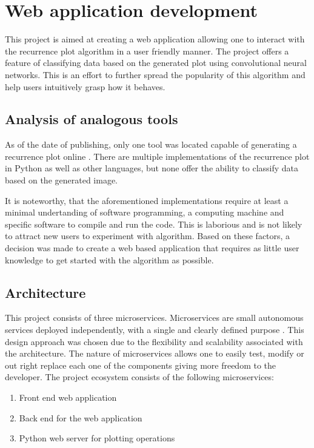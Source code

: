 \documentclass[a4paper,12pt,fleqn]{article}
\begin{document}
\newpage


\section{Web application development}
This project is aimed at creating a web application allowing one to interact with the recurrence plot algorithm in a user friendly manner.
The project offers a feature of classifying data based on the generated plot using convolutional neural networks.
This is an effort to further spread the popularity of this algorithm and help users intuitively grasp how it behaves.


\subsection{Analysis of analogous tools}
As of the date of publishing, only one tool was located capable 
of generating a recurrence plot online \cite{recurrence_plot_tk}. 
There are multiple implementations of the recurrence plot in Python as well as other
languages, but none offer the ability to classify data based on the generated image.

It is noteworthy, that the aforementioned implementations require at least a minimal undertanding of software programming, a computing machine and specific software to compile and run the code. 
This is laborious and is not likely to attract new users to experiment with algorithm.
Based on these factors, a decision was made to create a web based application that requires
as little user knowledge to get started with the algorithm as possible.


\subsection{Architecture}
This project consists of three microservices. 
Microservices are small autonomous services deployed independently, with a single and clearly defined purpose \cite{krause2015microservices}. This design approach was chosen due to the flexibility and scalability associated with the architecture. %
The nature of microservices allows one to easily test, modify or out right replace each one of the components giving more freedom to the developer.
The project ecosystem consists of the following microservices:
\begin{enumerate}
	\item Front end web application
	\item Back end for the web application
	\item Python web server for plotting operations
\end{enumerate}
\end{document}
